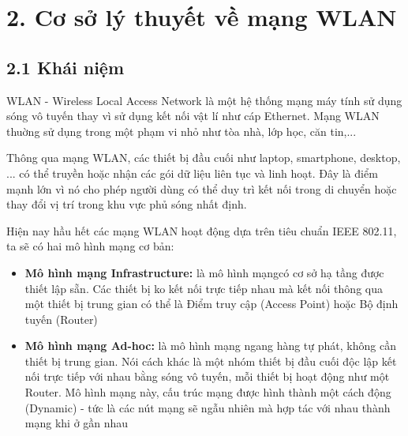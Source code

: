 \section{2. Cơ sở lý thuyết về mạng WLAN}

\subsection{2.1 Khái niệm}
WLAN - Wireless Local Access Network là một hệ thống mạng máy tính sử dụng sóng vô tuyến thay vì sử dụng kết nối vật lí như cáp Ethernet. 
Mạng WLAN thuờng sử dụng trong một phạm vi nhỏ như tòa nhà, lớp học, căn tin,...\cite{kurose2017}

Thông qua mạng WLAN, các thiết bị đầu cuối như laptop, smartphone, desktop, ... có thể truyền hoặc nhận các gói dữ liệu liên tục và linh hoạt. 
Đây là điểm mạnh lớn vì nó cho phép người dùng có thể duy trì kết nối trong di chuyển hoặc thay đổi vị trí trong khu vực phủ sóng nhất định\cite{tanenbaum2010}.

Hiện nay hầu hết các mạng WLAN hoạt động dựa trên tiêu chuẩn IEEE 802.11\cite{ieee80211}, ta sẽ có hai mô hình mạng cơ bản:
\begin{itemize}
    \item \textbf{Mô hình mạng Infrastructure:} là mô hình mạngcó cơ sở hạ tầng được thiết lập sẵn. Các thiết bị ko kết nối trực tiếp nhau mà kết nối thông qua một thiết bị trung gian có thể là Điểm truy cập (Access Point) hoặc Bộ định tuyến (Router) \cite{geeksforgeeks2023}
    \item \textbf{Mô hình mạng Ad-hoc:} là mô hình mạng ngang hàng tự phát, không cần thiết bị trung gian. Nói cách khác là một nhóm thiết bị đầu cuối độc lập kết nối trực tiếp với nhau bằng sóng vô tuyến, mỗi thiết bị hoạt động như một Router. Mô hình mạng này, cấu trúc mạng được hình thành một cách động (Dynamic) - tức là các nút mạng sẽ ngẫu nhiên mà hợp tác với nhau thành mạng khi ở gần nhau \cite{geeksforgeeks2023}
\end{itemize}

